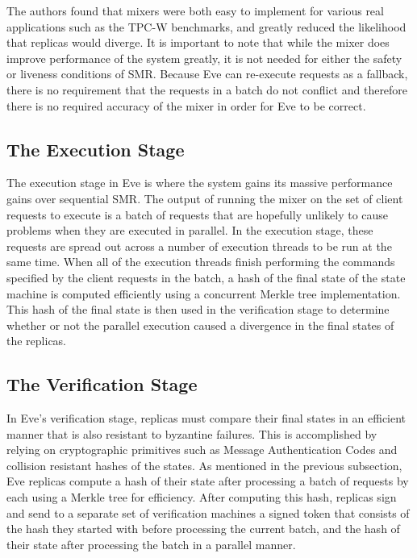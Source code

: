 \documentclass[11pt, oneside]{report}
\begin{document}
The authors found that mixers were both easy to implement for various real applications such as the TPC-W benchmarks, and greatly reduced the likelihood that replicas would diverge. It is important to note that while the mixer does improve performance of the system greatly, it is not needed for either the safety or liveness conditions of SMR. Because Eve can re-execute requests as a fallback, there is no requirement that the requests in a batch do not conflict and therefore there is no required accuracy of the mixer in order for Eve to be correct.

\subsection{The Execution Stage}\label{EveExecution}

The execution stage in Eve is where the system gains its massive performance gains over sequential SMR. The output of running the mixer on the set of client requests to execute is a batch of requests that are hopefully unlikely to cause problems when they are executed in parallel. In the execution stage, these requests are spread out across a number of execution threads to be run at the same time. When all of the execution threads finish performing the commands specified by the client requests in the batch, a hash of the final state of the state machine is computed efficiently using a concurrent Merkle tree implementation. This hash of the final state is then used in the verification stage to determine whether or not the parallel execution caused a divergence in the final states of the replicas.

\subsection{The Verification Stage}\label{EveVerification}
In Eve's verification stage, replicas must compare their final states in an efficient manner that is also resistant to byzantine failures. This is accomplished by relying on cryptographic primitives such as Message Authentication Codes and collision resistant hashes of the states. As mentioned in the previous subsection, Eve replicas compute a hash of their state after processing a batch of requests by each using a Merkle tree for efficiency. After computing this hash, replicas sign and send to a separate set of verification machines a signed token that consists of the hash they started with before processing the current batch, and the hash of their state after processing the batch in a parallel manner.
\end{document}
